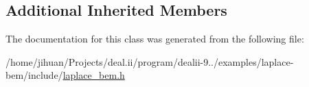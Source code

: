 \subsection*{Additional Inherited Members}


The documentation for this class was generated from the following file\+:\begin{DoxyCompactItemize}
\item 
/home/jihuan/\+Projects/deal.\+ii/program/dealii-\/9../examples/laplace-\/bem/include/\hyperlink{laplace__bem_8h}{laplace\+\_\+bem.\+h}\end{DoxyCompactItemize}
